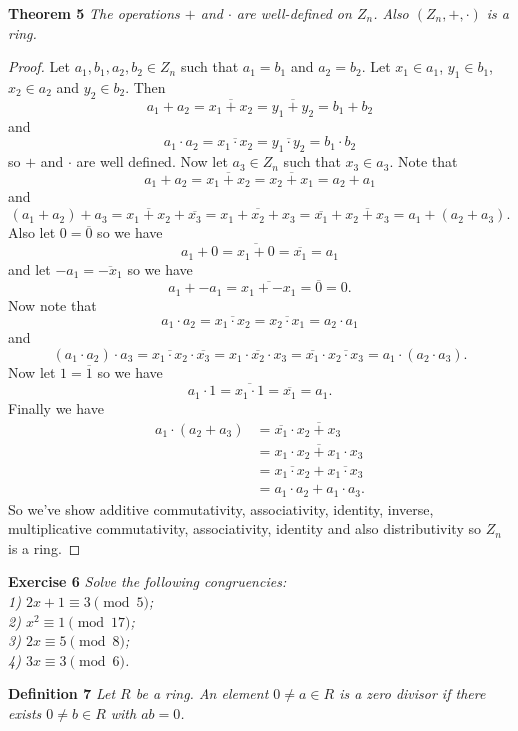 \documentclass{article}
\begin{document}
\begin{flushleft}
\textbf{Theorem 5}
\textsl{The operations $+$ and $\cdot$ are well-defined on $Z_n$. Also $(Z_n, +, \cdot)$ is a ring.}
\begin{proof}
Let $a_1, b_1, a_2, b_2 \in Z_n$ such that $a_1 = b_1$ and $a_2 = b_2$. Let $x_1 \in a_1$, $y_1 \in b_1$, $x_2 \in a_2$ and $y_2 \in b_2$. Then
\[
a_1 + a_2 = \overline{x_1 + x_2} = \overline{y_1 + y_2} = b_1 + b_2
\]
and
\[
a_1 \cdot a_2 = \overline{x_1 \cdot x_2} = \overline{y_1 \cdot y_2} = b_1 \cdot b_2
\]
so $+$ and $\cdot$ are well defined. Now let $a_3 \in Z_n$ such that $x_3 \in a_3$. Note that
\[
a_1 + a_2 = \overline{x_1 + x_2} = \overline{x_2 + x_1} = a_2 + a_1
\]
and
\[
(a_1 + a_2) + a_3 = \overline{x_1 + x_2} + \overline{x_3} = \overline{x_1 + x_2 + x_3} = \overline{x_1} + \overline{x_2 + x_3} = a_1 + (a_2 + a_3).
\]
Also let $0 = \overline{0}$ so we have
\[
a_1 + 0 = \overline{x_1 + 0} = \overline{x_1} = a_1
\]
and let $-a_1 = \overline{-x_1}$ so we have
\[
a_1 + -a_1 = \overline{x_1 + -x_1} = \overline{0} = 0.
\]
Now note that
\[
a_1 \cdot a_2 = \overline{x_1 \cdot x_2} = \overline{x_2 \cdot x_1} = a_2 \cdot a_1
\]
and
\[
(a_1 \cdot a_2) \cdot a_3 = \overline{x_1 \cdot x_2} \cdot \overline{x_3} = \overline{x_1 \cdot x_2 \cdot x_3} = \overline{x_1} \cdot \overline{x_2 \cdot x_3} = a_1 \cdot (a_2 \cdot a_3).
\]
Now let $1 = \overline{1}$ so we have
\[
a_1 \cdot 1 = \overline{x_1 \cdot 1} = \overline{x_1} = a_1.
\]
Finally we have
\begin{align*}
a_1 \cdot (a_2 + a_3) &= \overline{x_1} \cdot \overline{x_2 + x_3} \\
	&= \overline{x_1 \cdot x_2 + x_1 \cdot x_3} \\
	&= \overline{x_1 \cdot x_2} + \overline{x_1 \cdot x_3} \\
	&= a_1 \cdot a_2 + a_1 \cdot a_3.
\end{align*}
So we've show additive commutativity, associativity, identity, inverse, multiplicative commutativity, associativity, identity and also distributivity so $Z_n$ is a ring.
\end{proof}

\textbf{Exercise 6}
\textsl{Solve the following congruencies:\\
1) $2x+1 \equiv 3 \pmod{5}$; \\
2) $x^2 \equiv 1 \pmod{17}$; \\
3) $2x \equiv 5 \pmod{8}$; \\
4) $3x \equiv 3 \pmod{6}$.}\newline

\textbf{Definition 7}
\textsl{Let $R$ be a ring. An element $0 \neq a \in R$ is a zero divisor if there exists $0 \neq b \in R$ with $ab=0$.}\newline


\end{flushleft}
\end{document}

